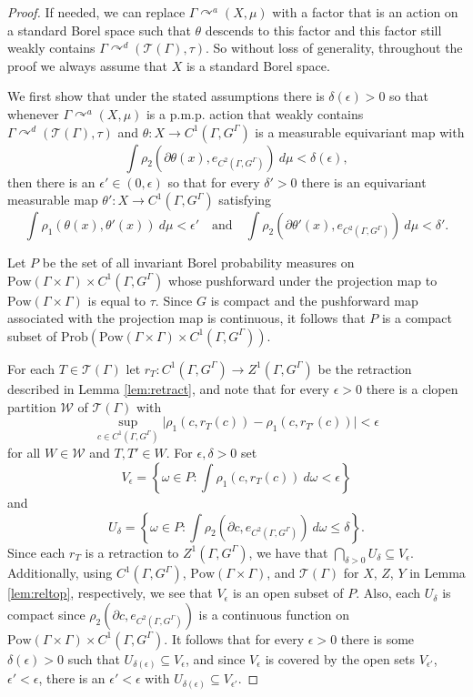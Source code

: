 \documentclass[12pt]{amsart}
\theoremstyle{definition}
\def\cal{\mathcal}
\newcommand{\pmp}{p{$.$}m{$.$}p{$.$}}
\newcommand{\acts}{\curvearrowright}
\newcommand{\Prob}{\mathrm{Prob}}
\newcommand{\Pow}[1]{\mathrm{Pow}(#1)}
\begin{document}
\begin{proof}
    If needed, we can replace $\Gamma \acts^a (X,\mu)$ with a factor that is an action on a standard Borel space such that $\theta$ descends to this factor and this factor still weakly contains $\Gamma \acts^d (\cal T(\Gamma), \tau)$. So without loss of generality, throughout the proof we always assume that $X$ is a standard Borel space.
    
    We first show that under the stated assumptions there is $\delta(\epsilon) > 0$ so that whenever $\Gamma \acts^a (X, \mu)$ is a {\pmp} action that weakly contains $\Gamma \acts^d (\cal T(\Gamma), \tau)$ and $\theta : X \rightarrow C^1(\Gamma, G^\Gamma)$ is a measurable equivariant map with
	\[\int \rho_2(\partial \theta(x), e_{C^2(\Gamma, G^\Gamma)}) \ d \mu < \delta(\epsilon),\]
	then there is an $\epsilon' \in (0, \epsilon)$ so that for every $\delta' > 0$ there is an equivariant measurable map $\theta' : X \rightarrow C^1(\Gamma, G^\Gamma)$ satisfying
	\[\int \rho_1(\theta(x), \theta'(x)) \ d \mu < \epsilon' \quad \text{and} \quad \int \rho_2(\partial \theta'(x), e_{C^2(\Gamma, G^\Gamma)}) \ d \mu < \delta'.\]
	
	Let $P$ be the set of all invariant Borel probability measures on $\Pow{\Gamma \times \Gamma} \times C^1(\Gamma, G^\Gamma)$ whose pushforward under the projection map to $\Pow{\Gamma \times \Gamma}$ is equal to $\tau$. Since $G$ is compact and the pushforward map associated with the projection map is continuous, it follows that $P$ is a compact subset of $\Prob(\Pow{\Gamma \times \Gamma} \times C^1(\Gamma, G^\Gamma))$.
	
	For each $T \in \cal T(\Gamma)$ let $r_T : C^1(\Gamma, G^\Gamma) \rightarrow Z^1(\Gamma, G^\Gamma)$ be the retraction described in Lemma \ref{lem:retract}, and note that for every $\epsilon > 0$ there is a clopen partition $\cal W$ of $\cal T(\Gamma)$ with
    \[\sup_{c \in C^1(\Gamma, G^\Gamma)} \big|\rho_1(c,r_T(c))-\rho_1(c,r_{T'}(c)) \big| < \epsilon\]
    for all $W \in \cal W$ and $T, T' \in W$. For $\epsilon, \delta > 0$ set
	\[V_\epsilon = \left\{\omega \in P : \int \rho_1(c, r_T(c)) \ d \omega < \epsilon\right\}\]
	and
	\[U_\delta = \left\{\omega \in P : \int \rho_2(\partial c, e_{C^2(\Gamma, G^\Gamma)}) \ d \omega \leq \delta\right\}.\]
	Since each $r_T$ is a retraction to $Z^1(\Gamma, G^\Gamma)$, we have that $\bigcap_{\delta > 0} U_\delta \subseteq V_\epsilon$. Additionally, using $C^1(\Gamma, G^\Gamma)$, $\Pow{\Gamma \times \Gamma}$, and $\cal T(\Gamma)$ for $X$, $Z$, $Y$ in Lemma \ref{lem:reltop}, respectively, we see that $V_\epsilon$ is an open subset of $P$. Also, each $U_\delta$ is compact since $\rho_2(\partial c, e_{C^2(\Gamma, G^\Gamma)})$ is a continuous function on $\Pow{\Gamma \times \Gamma} \times C^1(\Gamma, G^\Gamma)$. It follows that for every $\epsilon > 0$ there is some $\delta(\epsilon) > 0$ such that $U_{\delta(\epsilon)} \subseteq V_\epsilon$, and since $V_\epsilon$ is covered by the open sets $V_{\epsilon'}$, $\epsilon' < \epsilon$, there is an $\epsilon' < \epsilon$ with $U_{\delta(\epsilon)} \subseteq V_{\epsilon'}$.
	

\end{proof}
\end{document}
